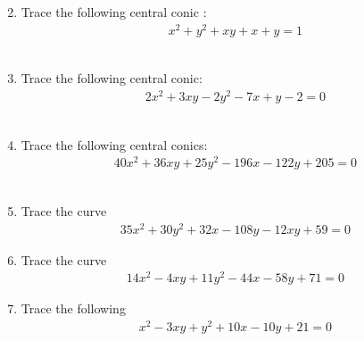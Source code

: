 \begin{enumerate}[label=\thesubsection.\arabic*.,ref=\thesubsection.\theenumi]
\begin{align}
\end{align}
%
\\
\solution

\item Trace the following central conic : 
\begin{align}
    x^2+y^2+xy+x+y=1\label{eq:solutions/41/18/eq:0}
\end{align}
%
\\
\solution

\item Trace the following central conic:
\begin{align}
  2x^2 + 3xy - 2y^2 - 7x + y - 2 = 0 \label{eq:solutions/41/19/eq:1}
\end{align}
%
\\
\solution

\item Trace the following central conics:
\begin{align}
   40{x^2}+36{xy}+25{y^2}-196{x}-122{y}+205=0
\end{align}
%
\\
\solution

\item Trace the curve
\begin{align}
35x^2+30y^2+32x-108y-12xy+59=0 \label{eq:solutions/41/ex/given_curve_eq}
\end{align}
%
\solution

\item Trace the curve
\begin{align}
14x^2 - 4xy + 11y^2 - 44x - 58y + 71 =0  \label{eq:solutions/41/ex1/given_curve_eq}
\end{align}

\solution

\item Trace the following 
\begin{align}
    x^2-3xy+y^2+10x-10y+21=0 \label{eq:solutions/41/ex2/eq 1}
\end{align}
%
\solution


\end{enumerate}
